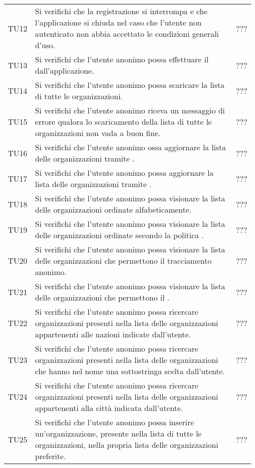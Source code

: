 {\begin{longtable}{ c  C{9cm} C{1cm}}
TU12 & Si verifichi che la registrazione si interrompa e che l'applicazione si chiuda nel caso che l'utente non autenticato non abbia accettato le condizioni generali d'uso. & ??? \\
TU13 & Si verifichi che l'utente anonimo possa effettuare il  dall'applicazione. & ??? \\
TU14 & Si verifichi che l'utente anonimo possa scaricare la lista di tutte le organizzazioni. & ??? \\
TU15 & Si verifichi che l'utente anonimo riceva un messaggio di errore qualora lo scaricamento della lista di tutte le organizzazioni non vada a buon fine. & ??? \\
TU16 & Si verifichi che l'utente anonimo ossa aggiornare la lista delle organizzazioni tramite . & ??? \\
TU17 & Si verifichi che l'utente anonimo possa aggiornare la lista delle organizzazioni tramite . & ??? \\
TU18 & Si verifichi che l'utente anonimo possa visionare la lista delle organizzazioni ordinate alfabeticamente. & ??? \\
TU19 & Si verifichi che l'utente anonimo possa visionare la lista delle organizzazioni ordinate secondo la politica . & ??? \\
TU20 & Si verifichi che l'utente anonimo possa visionare la lista delle organizzazioni che permettono il tracciamento anonimo. & ??? \\
TU21 & Si verifichi che l'utente anonimo possa visionare la lista delle organizzazioni che permettono il . & ??? \\
TU22 & Si verifichi che l'utente anonimo possa ricercare organizzazioni presenti nella lista delle organizzazioni appartenenti alle nazioni indicate dall'utente. & ??? \\
TU23 & Si verifichi che l'utente anonimo possa ricercare organizzazioni presenti nella lista delle organizzazioni che hanno nel nome una sottostringa scelta dall'utente. & ??? \\
TU24 & Si verifichi che l'utente anonimo possa ricercare organizzazioni presenti nella lista delle organizzazioni appartenenti alla città indicata dall'utente. & ??? \\
TU25 & Si verifichi che l'utente anonimo possa inserire un'organizzazione, presente nella lista di tutte le organizzazioni, nella propria lista delle organizzazioni preferite. & ??? \\

\end{longtable}}
